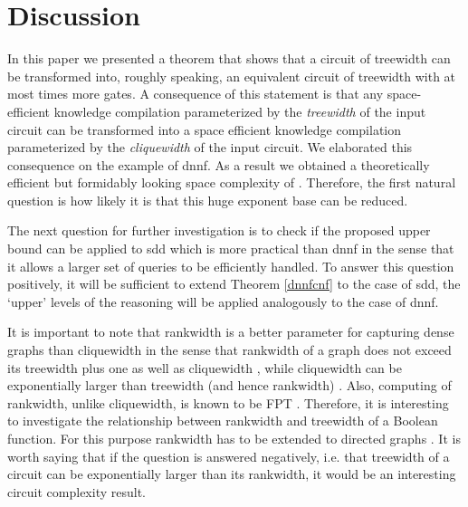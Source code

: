 \documentclass{llncs}
\begin{document}
\section{Discussion}
In this paper we presented a theorem that shows that a circuit of treewidth  can be 
transformed into, roughly speaking, an equivalent circuit of treewidth  with at most  times 
more gates. A consequence of this statement is that any space-efficient knowledge compilation
parameterized by the \emph{treewidth} of the input circuit can be transformed into a space
efficient knowledge compilation parameterized  by the \emph{cliquewidth} of the input circuit.
We elaborated this consequence on the example of {\sc dnnf}. 
As a result we obtained a theoretically efficient but formidably
looking space complexity of . Therefore, the first natural question is how likely it is that this huge 
exponent base can be reduced. 
\begin{comment}
We believe there is a lot of room for improvement.
For example, the  increase of the treewidth bound compared to cliquewidth is the result of double multiplication by ,
first by a type respecting clique decomposition and then by associating each label with  gates. We believe that
the type respecting decomposition can be avoided at the price of associating each label with  gates: two {\sc and} ones
and two {\sc or} ones and thus the bound on the treewidth would be  instead .
\end{comment}

The next question for further investigation is to check if the proposed upper bound can be applied to {\sc sdd} \cite{SDD} which is more 
practical than {\sc dnnf} in the sense that it allows a larger set of queries to be efficiently handled. To answer this question
positively, it will be sufficient to extend Theorem \ref{dnnfcnf} to the case of {\sc sdd}, the `upper' levels of the reasoning will
be applied analogously to the case of {\sc dnnf}. 

It is important to note that rankwidth is a better parameter for capturing dense graphs than cliquewidth
in the sense that rankwidth of a graph does not exceed its treewidth plus one \cite{RWDvsTWD} as well as cliquewidth \cite{CWDApprox}, 
while cliquewidth can be exponentially larger than treewidth (and hence rankwidth) \cite{CorRo}.
Also, computing of rankwidth, unlike cliquewidth, is known to be FPT \cite{RWDCompute}. Therefore, it is interesting to 
investigate the relationship between rankwidth and treewidth of a Boolean function. For this purpose rankwidth has to be extended
to directed graphs \cite{DirRWD}. It is worth saying that if the question is answered negatively, i.e. that treewidth
of a circuit can be exponentially larger than its rankwidth, it would be an interesting circuit complexity result.
\end{document}

